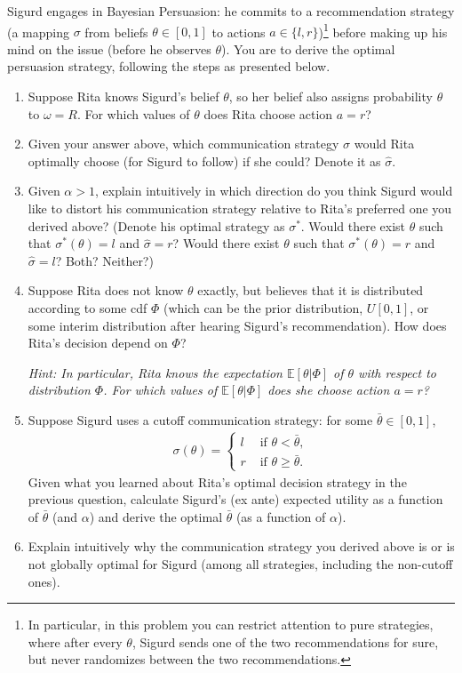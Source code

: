 \documentclass[a4paper]{article}
\begin{document}
Sigurd engages in Bayesian Persuasion: he commits to a recommendation strategy (a mapping $\sigma$ from beliefs $\theta \in [0,1]$ to actions $a \in \{l,r\}$)\footnote{In particular, in this problem you can restrict attention to pure strategies, where after every $\theta$, Sigurd sends one of the two recommendations for sure, but never randomizes between the two recommendations.} 
before making up his mind on the issue (before he observes $\theta$). You are to derive the optimal persuasion strategy, following the steps as presented below.
\begin{enumerate}
	\item Suppose Rita knows Sigurd's belief $\theta$, so her belief also assigns probability $\theta$ to $\omega=R$. For which values of $\theta$ does Rita choose action $a=r$?
	
	\item Given your answer above, which communication strategy $\sigma$ would Rita optimally choose (for Sigurd to follow) if she could? Denote it as $\hat{\sigma}$.
	
	\item Given $\alpha>1$, explain intuitively in which direction do you think Sigurd would like to distort his communication strategy relative to Rita's preferred one you derived above? 
	(Denote his optimal strategy as $\sigma^*$. Would there exist $\theta$ such that $\sigma^*(\theta)=l$ and $\hat{\sigma}=r$? Would there exist $\theta$ such that $\sigma^*(\theta)=r$ and $\hat{\sigma}=l$? Both? Neither?)
	
	\item Suppose Rita does not know $\theta$ exactly, but believes that it is distributed according to some cdf $\Phi$ (which can be the prior distribution, $U[0,1]$, or some interim distribution after hearing Sigurd's recommendation). How does Rita's decision depend on $\Phi$?
	
	\emph{Hint: In particular, Rita knows the expectation $\mathbb{E}[\theta|\Phi]$ of $\theta$ with respect to distribution $\Phi$. For which values of $\mathbb{E}[\theta|\Phi]$ does she choose action $a=r$?}
	
	\item Suppose Sigurd uses a cutoff communication strategy: for some $\bar{\theta} \in [0,1]$,
	\begin{align*}
		\sigma(\theta) = \begin{cases}
			l & \text{ if } \theta < \bar{\theta},
			\\
			r & \text{ if } \theta \geq \bar{\theta}.
		\end{cases}
	\end{align*}
	Given what you learned about Rita's optimal decision strategy in the previous question, calculate Sigurd's (ex ante) expected utility as a function of $\bar{\theta}$ (and $\alpha$) and derive the optimal $\bar{\theta}$ (as a function of $\alpha$).
	
	\item Explain intuitively why the communication strategy you derived above is or is not globally optimal for Sigurd (among all strategies, including the non-cutoff ones).
\end{enumerate}
\end{document}
